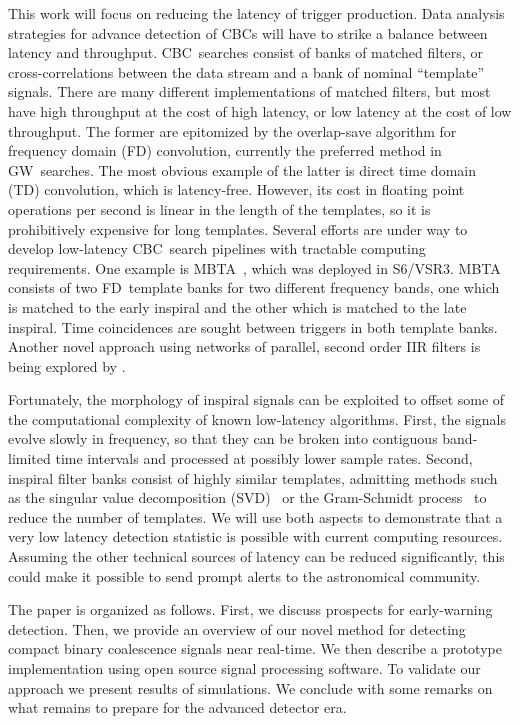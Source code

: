\documentclass[preprint2]{aastex}
\newcommand{\mbta}{MBTA}
\newcommand{\GW}{GW}%
\newcommand{\CBC}{CBC}%
\newcommand{\SVD}{SVD}%
\newcommand{\TD}{TD}%
\newcommand{\FD}{FD}%
\begin{document}
This work will focus on reducing the latency of trigger production.  Data
analysis strategies for advance detection of \CBC{}s will have to strike a
balance between latency and throughput. \CBC\ searches consist of banks of
matched filters, or cross-correlations between the data stream and a bank of
nominal ``template'' signals.  There are many different implementations of
matched filters, but most have high throughput at the cost of high latency, or
low latency at the cost of low throughput.  The former are epitomized by the
overlap-save algorithm for frequency domain (\FD) convolution, currently the
preferred method in \GW\ searches.  The most obvious example of the latter is
direct time domain (\TD) convolution, which is latency-free.  However, its cost in floating
point operations per second is linear in the length of the templates, so it is
prohibitively expensive for long templates.  Several efforts are under way to
develop low-latency \CBC\ search pipelines with tractable computing requirements.
One example is \mbta{}~\citep{Marion2004, Buskulic2010}, which was deployed in
S6/VSR3.  MBTA consists of two \FD\ template banks for two different frequency bands, one which is matched to the early inspiral and the other which is matched to the late inspiral.  Time coincidences are sought between triggers in both template banks.  Another novel approach using networks of parallel, second order IIR filters is being explored
by \citet{shaunIIR, linqingIIR}.

Fortunately, the morphology of inspiral signals can be exploited to offset some
of the computational complexity of known low-latency algorithms.  First, the signals
evolve slowly in frequency, so that they can be broken into contiguous
band-limited time intervals and processed at possibly lower sample rates.
Second, inspiral filter banks consist of highly similar templates, admitting
methods such as the singular value decomposition (\SVD)~\citep{Cannon:2010p10398}
or the Gram-Schmidt process~\citep{rbf} to reduce the number of templates.  We
will use both aspects to demonstrate that a very low latency detection statistic
is possible with current computing resources.  Assuming the other technical
sources of latency can be reduced significantly, this could make it possible to
send prompt alerts to the astronomical community.

The paper is organized as follows.  First, we discuss prospects for early-warning
detection.  Then, we provide an overview of our novel method for detecting compact
binary coalescence signals near real-time. We then describe a prototype
implementation using open source signal processing software.  To validate our approach
we present results of simulations.  We conclude with some remarks on what remains to
prepare for the advanced detector era.
\end{document}
